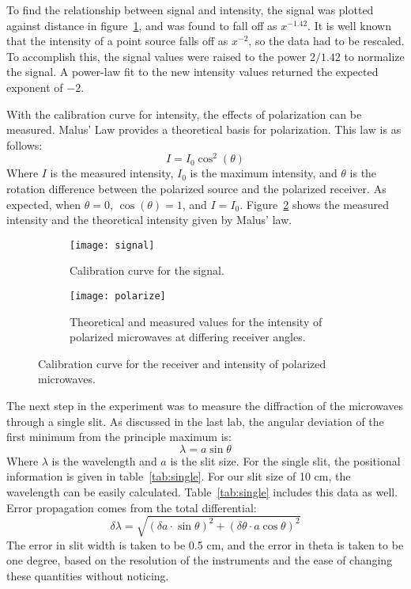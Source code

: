\documentclass[letterpaper]{article}
\begin{document}
To find the relationship between signal and intensity, the signal was plotted against distance in figure~\ref{fig:calibration}, and was found to fall off as $x^{-1.42}$. It is well known that the intensity of a point source falls off as $x^{-2}$, so the data had to be rescaled. To accomplish this, the signal values were raised to the power $2/1.42$ to normalize the signal. A power-law fit to the new intensity values returned the expected exponent of $-2$.

With the calibration curve for intensity, the effects of polarization can be measured. Malus' Law provides a theoretical basis for polarization. This law is as follows:
\[
I = I_0\cos^2\left(\theta\right)
\]
Where $I$ is the measured intensity, $I_0$ is the maximum intensity, and $\theta$ is the rotation difference between the polarized source and the polarized receiver. As expected, when $\theta = 0$, $\cos(\theta) = 1$, and $I = I_0$. Figure~\ref{fig:polarize} shows the measured intensity and the theoretical intensity given by Malus' law.
\begin{figure}
\centering
\begin{subfigure}{0.475\textwidth}
  \centering
  \texttt{[image: signal]}
  \caption{Calibration curve for the signal.}
  \label{fig:calibration}
\end{subfigure}
\begin{subfigure}{0.475\textwidth}
  \centering
  \texttt{[image: polarize]}
  \caption{Theoretical and measured values for the intensity of polarized microwaves at differing receiver angles.}
  \label{fig:polarize}
\end{subfigure}
\label{fig:allfigurestwo}
\caption{Calibration curve for the receiver and intensity of polarized microwaves.}
\end{figure}

The next step in the experiment was to measure the diffraction of the microwaves through a single slit. As discussed in the last lab, the angular deviation of the first minimum from the principle maximum is:
\[
\lambda = a\sin\theta
\]
Where $\lambda$ is the wavelength and $a$ is the slit size. For the single slit, the positional information is given in table~\ref{tab:single}. For our slit size of 10 cm, the wavelength can be easily calculated. Table~\ref{tab:single} includes this data as well. Error propagation comes from the total differential:
\[
\delta\lambda=\sqrt{
  \left(\delta a\cdot\sin\theta\right)^2+
  \left(\delta\theta\cdot a\cos\theta\right)^2
} 
\]
The error in slit width is taken to be 0.5 cm, and the error in theta is taken to be one degree, based on the resolution of the instruments and the ease of changing these quantities without noticing. 
\end{document}
